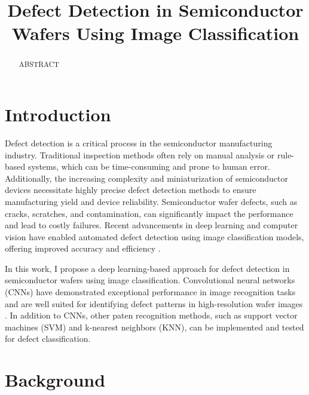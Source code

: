 \documentclass[conference]{IEEEtran}
\begin{document}
\title{
    Defect Detection in Semiconductor Wafers Using Image Classification
}

\author{
}

\maketitle

\begin{abstract}
    ABSTRACT
\end{abstract}

\section{Introduction}
Defect detection is a critical process in the semiconductor manufacturing industry. 
Traditional inspection methods often rely on manual analysis or rule-based systems, which can be time-consuming 
and prone to human error.
Additionally, the increasing complexity and miniaturization of semiconductor devices necessitate highly precise 
defect detection methods to ensure manufacturing yield and device reliability.
Semiconductor wafer defects, such as cracks, scratches, and contamination, can significantly impact the performance
and lead to costly failures. 
Recent advancements in deep learning and computer vision have enabled automated defect detection using image classification
models, offering improved accuracy and efficiency \cite{b1}.

In this work, I propose a deep learning-based approach for defect detection in semiconductor wafers using image classification.
Convolutional neural networks (CNNs) have demonstrated exceptional performance in image recognition tasks and are well
suited for identifying defect patterns in high-resolution wafer images \cite{b2}. 
In addition to CNNs, other paten recognition methods, such as support vector machines (SVM) and k-nearest neighbors (KNN),
can be implemented and tested for defect classification. 

\section{Background}
\end{document}
